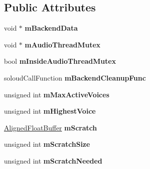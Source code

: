 \subsection*{Public Attributes}
\begin{DoxyCompactItemize}
\item 
\mbox{\label{class_so_loud_1_1_soloud_a2a3c5a468a6cc39130c42ff3f7e67ed7}} 
void $\ast$ {\bfseries m\+Backend\+Data}
\item 
\mbox{\label{class_so_loud_1_1_soloud_a6bb9b906b4432ebcca84091c27eb374f}} 
void $\ast$ {\bfseries m\+Audio\+Thread\+Mutex}
\item 
\mbox{\label{class_so_loud_1_1_soloud_a8b96625c438e5b0b26f5746dccb145a6}} 
bool {\bfseries m\+Inside\+Audio\+Thread\+Mutex}
\item 
\mbox{\label{class_so_loud_1_1_soloud_a2ab636beed7b2fe5d60424339a05874d}} 
soloud\+Call\+Function {\bfseries m\+Backend\+Cleanup\+Func}
\item 
\mbox{\label{class_so_loud_1_1_soloud_ac519d07bb7442f7591502f214af635a3}} 
unsigned int {\bfseries m\+Max\+Active\+Voices}
\item 
\mbox{\label{class_so_loud_1_1_soloud_ad2993a824d6c9149e6448209f2c7fa9d}} 
unsigned int {\bfseries m\+Highest\+Voice}
\item 
\mbox{\label{class_so_loud_1_1_soloud_ac7c9967946184c12706a3e70774d9808}} 
\mbox{\hyperlink{class_so_loud_1_1_aligned_float_buffer}{Aligned\+Float\+Buffer}} {\bfseries m\+Scratch}
\item 
\mbox{\label{class_so_loud_1_1_soloud_a4628c0226d4d04fc0a5cd5c1f52410d9}} 
unsigned int {\bfseries m\+Scratch\+Size}
\item 
\mbox{\label{class_so_loud_1_1_soloud_adcc23465b671bfba16ca902b6abf0e0c}} 
unsigned int {\bfseries m\+Scratch\+Needed}
\item 
\mbox{\label{class_so_loud_1_1_soloud_ab55d9d6d6c5c1fa3a722b86a313ca3b4}} 

\end{DoxyCompactItemize}

